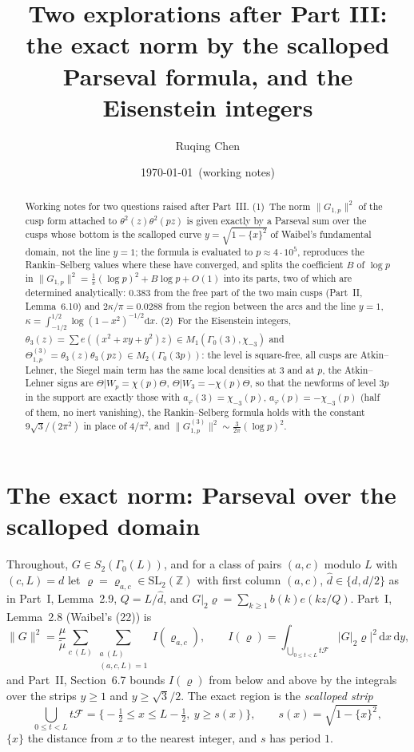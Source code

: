 \documentclass[11pt]{amsart}
\title[Two explorations after Part III]{Two explorations after Part III:\\ the exact norm by the scalloped Parseval formula, and the Eisenstein integers}
\author{Ruqing Chen}
\date{\today\ (working notes)}
\theoremstyle{remark}
\newcommand{\Z}{\mathbb{Z}}
\newcommand{\dd}{\mathrm{d}}
\begin{document}
\begin{abstract}
Working notes for two questions raised after Part~III. (1)~The norm $\|G_{1,p}\|^2$ of the cusp form attached to $\theta^2(z)\theta^2(pz)$ is given exactly by a Parseval sum over the cusps whose bottom is the scalloped curve $y=\sqrt{1-\{x\}^2}$ of Waibel's fundamental domain, not the line $y=1$; the formula is evaluated to $p\approx4\cdot10^5$, reproduces the Rankin--Selberg values where these have converged, and splits the coefficient $B$ of $\log p$ in $\|G_{1,p}\|^2=\frac1\pi(\log p)^2+B\log p+O(1)$ into its parts, two of which are determined analytically: $0.383$ from the free part of the two main cusps (Part~II, Lemma~6.10) and $2\kappa/\pi=0.0288$ from the region between the arcs and the line $y=1$, $\kappa=\int_{-1/2}^{1/2}\log(1-x^2)^{-1/2}\dd x$. (2)~For the Eisenstein integers, $\theta_3(z)=\sum e((x^2+xy+y^2)z)\in M_1(\Gamma_0(3),\chi_{-3})$ and $\Theta^{(3)}_{1,p}=\theta_3(z)\theta_3(pz)\in M_2(\Gamma_0(3p))$: the level is square-free, all cusps are Atkin--Lehner, the Siegel main term has the same local densities at $3$ and at $p$, the Atkin--Lehner signs are $\Theta|W_p=\chi(p)\Theta$, $\Theta|W_3=-\chi(p)\Theta$, so that the newforms of level $3p$ in the support are exactly those with $a_\varphi(3)=\chi_{-3}(p)$, $a_\varphi(p)=-\chi_{-3}(p)$ (half of them, no inert vanishing), the Rankin--Selberg formula holds with the constant $9\sqrt3/(2\pi^2)$ in place of $4/\pi^2$, and $\|G^{(3)}_{1,p}\|^2\sim\frac3{2\pi}(\log p)^2$.
\end{abstract}
\maketitle

\section{The exact norm: Parseval over the scalloped domain}\label{sec:scallop}

Throughout, $G\in S_2(\Gamma_0(L))$, and for a class of pairs $(a,c)$ modulo $L$ with $(c,L)=d$ let $\varrho=\varrho_{a,c}\in\mathrm{SL}_2(\Z)$ with first column $(a,c)$, $\hat d\in\{d,d/2\}$ as in Part~I, Lemma~2.9, $Q=L/\hat d$, and $G|_2\varrho=\sum_{k\ge1}b(k)e(kz/Q)$. Part~I, Lemma~2.8 (Waibel's (22)) is
\begin{equation}\label{eq:W1}
\|G\|^2=\frac\mu{\tilde\mu}\sum_{c\ (L)}\sum_{\substack{a\ (L)\\(a,c,L)=1}}I(\varrho_{a,c}),\qquad I(\varrho)=\int_{\bigcup_{0\le t<L}t\mathcal F}|G|_2\varrho|^2\,\dd x\,\dd y,
\end{equation}
and Part~II, Section~6.7 bounds $I(\varrho)$ from below and above by the integrals over the strips $y\ge1$ and $y\ge\sqrt3/2$. The exact region is the \emph{scalloped strip}
\[
\bigcup_{0\le t<L}t\mathcal F=\bigl\{-\tfrac12\le x\le L-\tfrac12,\ y\ge s(x)\bigr\},\qquad s(x)=\sqrt{1-\{x\}^2},
\]
$\{x\}$ the distance from $x$ to the nearest integer, and $s$ has period $1$.
\end{document}
